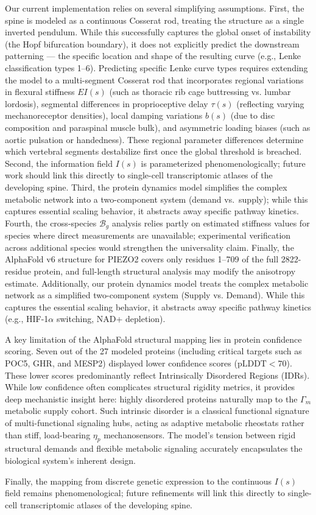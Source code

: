 Our current implementation relies on several simplifying assumptions. First, the spine is modeled as a continuous Cosserat rod, treating the structure as a single inverted pendulum. While this successfully captures the global onset of instability (the Hopf bifurcation boundary), it does not explicitly predict the downstream patterning --- the specific location and shape of the resulting curve (e.g., Lenke classification types 1--6). Predicting specific Lenke curve types requires extending the model to a multi-segment Cosserat rod that incorporates regional variations in flexural stiffness $EI(s)$ (such as thoracic rib cage buttressing vs. lumbar lordosis), segmental differences in proprioceptive delay $\tau(s)$ (reflecting varying mechanoreceptor densities), local damping variations $b(s)$ (due to disc composition and paraspinal muscle bulk), and asymmetric loading biases (such as aortic pulsation or handedness). These regional parameter differences determine which vertebral segments destabilize first once the global threshold is breached. Second, the information field $I(s)$ is parameterized phenomenologically; future work should link this directly to single-cell transcriptomic atlases of the developing spine. Third, the protein dynamics model simplifies the complex metabolic network into a two-component system (demand vs.\ supply); while this captures essential scaling behavior, it abstracts away specific pathway kinetics. Fourth, the cross-species $\mathcal{B}_g$ analysis relies partly on estimated stiffness values for species where direct measurements are unavailable; experimental verification across additional species would strengthen the universality claim. Finally, the AlphaFold v6 structure for PIEZO2 covers only residues 1--709 of the full 2822-residue protein, and full-length structural analysis may modify the anisotropy estimate.
Additionally, our protein dynamics model treats the complex metabolic network as a simplified two-component system (Supply vs. Demand). While this captures the essential scaling behavior, it abstracts away specific pathway kinetics (e.g., HIF-1$\alpha$ switching, NAD+ depletion).

A key limitation of the AlphaFold structural mapping lies in protein confidence scoring. Seven out of the 27 modeled proteins (including critical targets such as POC5, GHR, and MESP2) displayed lower confidence scores ($\text{pLDDT} < 70$). These lower scores predominantly reflect Intrinsically Disordered Regions (IDRs). While low confidence often complicates structural rigidity metrics, it provides deep mechanistic insight here: highly disordered proteins naturally map to the $\Gamma_m$ metabolic supply cohort. Such intrinsic disorder is a classical functional signature of multi-functional signaling hubs, acting as adaptive metabolic rheostats rather than stiff, load-bearing $\eta_p$ mechanosensors. The model's tension between rigid structural demands and flexible metabolic signaling accurately encapsulates the biological system's inherent design.

Finally, the mapping from discrete genetic expression to the continuous $I(s)$ field remains phenomenological; future refinements will link this directly to single-cell transcriptomic atlases of the developing spine.
